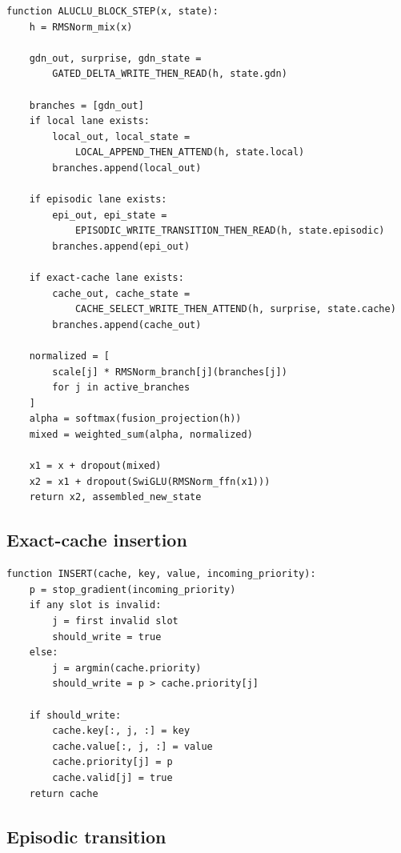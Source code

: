 \begin{lstlisting}[caption={Semantic order of a single block step.}]
function ALUCLU_BLOCK_STEP(x, state):
    h = RMSNorm_mix(x)

    gdn_out, surprise, gdn_state =
        GATED_DELTA_WRITE_THEN_READ(h, state.gdn)

    branches = [gdn_out]
    if local lane exists:
        local_out, local_state =
            LOCAL_APPEND_THEN_ATTEND(h, state.local)
        branches.append(local_out)

    if episodic lane exists:
        epi_out, epi_state =
            EPISODIC_WRITE_TRANSITION_THEN_READ(h, state.episodic)
        branches.append(epi_out)

    if exact-cache lane exists:
        cache_out, cache_state =
            CACHE_SELECT_WRITE_THEN_ATTEND(h, surprise, state.cache)
        branches.append(cache_out)

    normalized = [
        scale[j] * RMSNorm_branch[j](branches[j])
        for j in active_branches
    ]
    alpha = softmax(fusion_projection(h))
    mixed = weighted_sum(alpha, normalized)

    x1 = x + dropout(mixed)
    x2 = x1 + dropout(SwiGLU(RMSNorm_ffn(x1)))
    return x2, assembled_new_state
\end{lstlisting}

\subsection{Exact-cache insertion}

\begin{lstlisting}[caption={Deterministic strict replacement for one batch
item.}]
function INSERT(cache, key, value, incoming_priority):
    p = stop_gradient(incoming_priority)
    if any slot is invalid:
        j = first invalid slot
        should_write = true
    else:
        j = argmin(cache.priority)
        should_write = p > cache.priority[j]

    if should_write:
        cache.key[:, j, :] = key
        cache.value[:, j, :] = value
        cache.priority[j] = p
        cache.valid[j] = true
    return cache
\end{lstlisting}

\subsection{Episodic transition}

